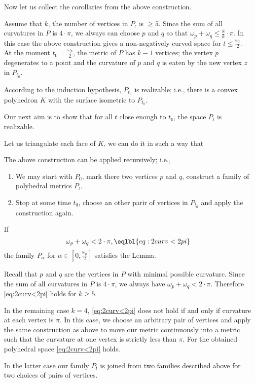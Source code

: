 Now let us collect the corollaries from the above 
construction.

Assume that $k$, the number of vertices in $P$, is $\ge 5$.
Since the sum of all curvatures in $P$ is $4\cdot\pi$,
we always can choose $p$ and $q$ so that $\omega_p+\omega_q\le\tfrac8k\cdot\pi$.
In this case the above construction gives a non-negatively curved space for $t\le \tfrac{\omega_p}{2}$.
At the moment $t_0=\tfrac{\omega_p}{2}$,
the metric of $P$ has $k-1$ vertices;
the vertex $p$ degenerates to a point and the curvature of $p$ and $q$ is eaten by the new vertex $z$ in $P_{t_0}$.

According to the induction hypothesis,
$P_{t_0}$ is realizable;
i.e., there is a convex polyhedron $K$ with the surface isometric to $P_{t_0}$.

Our next aim is to show that 
for all $t$ close enough to $t_0$,
the space $P_t$ is realizable.

Let us triangulate each face of $K$,
we can do it in such a way that


The above construction can be applied recursively;
i.e.,
\begin{enumerate}
\item We may start with $P_0$, mark there two vertices $p$ and $q$, construct a family of polyhedral metrics $P_t$.
\item Stop at some time $t_0$, choose an other parir of vertices in $P_{t_0}$ and apply the construction again. 
\end{enumerate}

 


If 
$$\omega_p+\omega_q<2\cdot\pi,\eqlbl{eq:2curv<2pi}$$ 
the family $P_\alpha$ for $\alpha\in [0,\tfrac{\omega_p}2]$ satisfies the Lemma.

Recall that $p$ and $q$ are the vertices in $P$ with minimal possible curvature.
Since the sum of all curvatures in $P$ is $4\cdot\pi$,
we always have $\omega_p+\omega_q<2\cdot\pi$.
Therefore \ref{eq:2curv<2pi} holds for $k\ge 5$.

In the remaining case $k=4$, \ref{eq:2curv<2pi} does not hold if and only if curvature at each vertex is $\pi$.
In this case, we choose an arbitrary pair of vertices and apply the same construction as above to move our metric continuously into a metric such that the curvature at one vertex is strictly less than $\pi$.
For the obtained polyhedral space \ref{eq:2curv<2pi} holds.

In the latter case our family $P_t$ is joined from two families described above for two choices of pairs of vertices.
\qeds

